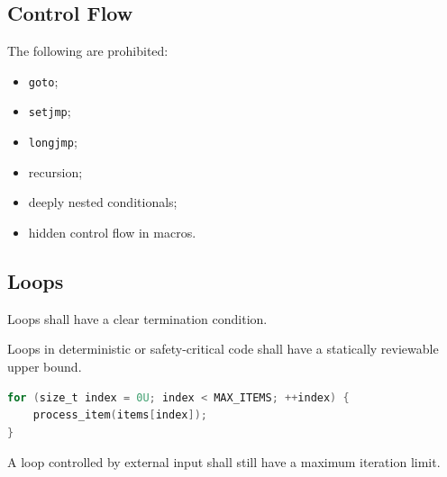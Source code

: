 \subsection{Control Flow}

The following are prohibited:

\begin{itemize}
	\item \texttt{goto};
	\item \texttt{setjmp};
	\item \texttt{longjmp};
	\item recursion;
	\item deeply nested conditionals;
	\item hidden control flow in macros.
\end{itemize}

\subsection{Loops}

Loops shall have a clear termination condition.

Loops in deterministic or safety-critical code shall have a statically reviewable upper bound.

\begin{lstlisting}[language=C]
for (size_t index = 0U; index < MAX_ITEMS; ++index) {
	process_item(items[index]);
}
\end{lstlisting}

A loop controlled by external input shall still have a maximum iteration limit.

